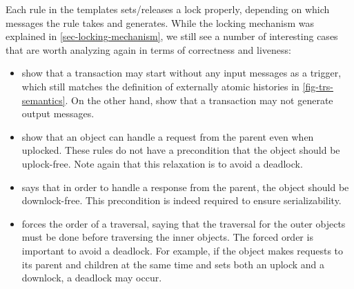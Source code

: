 \documentclass[sigplan,10pt,review,anonymous,screen]{acmart}\settopmatter{printfolios=true,printccs=false,printacmref=false}
\begin{document}
Each rule in the templates sets/releases a lock properly, depending on which messages the rule takes and generates.
While the locking mechanism was explained in \autoref{sec-locking-mechanism}, we still see a number of interesting cases that are worth analyzing again in terms of correctness and liveness:
\begin{itemize}[leftmargin=*]
\item {} show that a transaction may start without any input messages as a trigger, which still matches the definition of externally atomic histories in \autoref{fig-trs-semantics}. On the other hand,  show that a transaction may not generate output messages.
\item {} show that an object can handle a request from the parent even when uplocked. These rules do not have a precondition that the object should be uplock-free. Note again that this relaxation is to avoid a deadlock.
\item {} says that in order to handle a response from the parent, the object should be downlock-free. This precondition is indeed required to ensure serializability.
\item {} forces the order of a traversal, saying that the traversal for the outer objects must be done before traversing the inner objects. The forced order is important to avoid a deadlock. For example, if the object makes requests to its parent and children at the same time and sets both an uplock and a downlock, a deadlock may occur.
\end{itemize}

\end{document}

